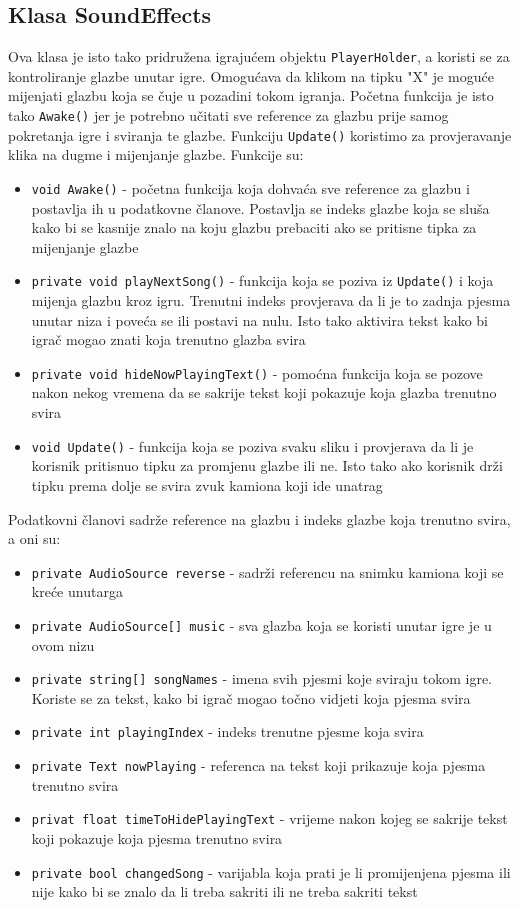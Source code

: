 \subsection{Klasa SoundEffects}
Ova klasa je isto tako pridružena igrajućem objektu \texttt{PlayerHolder}, a koristi se za kontroliranje glazbe unutar igre. Omogućava da klikom na tipku "X" je moguće mijenjati glazbu koja se čuje u pozadini tokom igranja. Početna funkcija je isto tako \texttt{Awake()} jer je potrebno učitati sve reference za glazbu prije samog pokretanja igre i sviranja te glazbe. Funkciju \texttt{Update()} koristimo za provjeravanje klika na dugme i mijenjanje glazbe. Funkcije su:
\begin{itemize}
	\item \texttt{void Awake()} - početna funkcija koja dohvaća sve reference za glazbu i postavlja ih u podatkovne članove. Postavlja se indeks glazbe koja se sluša kako bi se kasnije znalo na koju glazbu prebaciti ako se pritisne tipka za mijenjanje glazbe
	\item \texttt{private void playNextSong()} - funkcija koja se poziva iz \newline \texttt{Update()} i koja mijenja glazbu kroz igru. Trenutni indeks provjerava da li je to zadnja pjesma unutar niza i poveća se ili postavi na nulu. Isto tako aktivira tekst kako bi igrač mogao znati koja trenutno glazba svira
	\item \texttt{private void hideNowPlayingText()} - pomoćna funkcija koja se pozove nakon nekog vremena da se sakrije tekst koji pokazuje koja glazba trenutno svira
	\item \texttt{void Update()} - funkcija koja se poziva svaku sliku i provjerava da li je korisnik pritisnuo tipku za promjenu glazbe ili ne. Isto tako ako korisnik drži tipku prema dolje se svira zvuk kamiona koji ide unatrag
\end{itemize}
Podatkovni članovi sadrže reference na glazbu i indeks glazbe koja trenutno svira, a oni su:
\begin{itemize}
	\item \texttt{private AudioSource reverse} - sadrži referencu na snimku kamiona koji se kreće unutarga
	\item \texttt{private AudioSource[] music} - sva glazba koja se koristi unutar igre je u ovom nizu
	\item \texttt{private string[] songNames} - imena svih pjesmi koje sviraju tokom igre. Koriste se za tekst, kako bi igrač mogao točno vidjeti koja pjesma svira
	\item \texttt{private int playingIndex} - indeks trenutne pjesme koja svira
	\item \texttt{private Text nowPlaying} - referenca na tekst koji prikazuje koja pjesma trenutno svira
	\item \texttt{privat float timeToHidePlayingText} - vrijeme nakon kojeg se sakrije tekst koji pokazuje koja pjesma trenutno svira 
	\item \texttt{private bool changedSong} - varijabla koja prati je li promijenjena pjesma ili nije kako bi se znalo da li treba sakriti ili ne treba sakriti tekst
\end{itemize}
